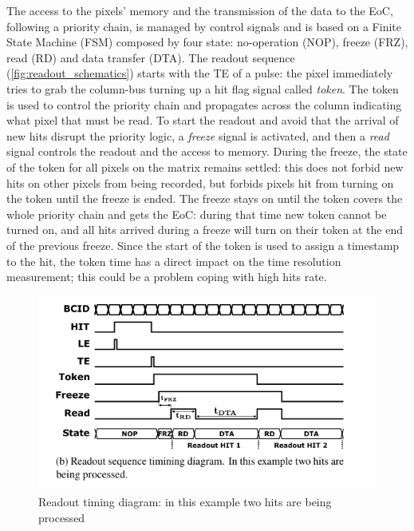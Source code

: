     The access to the pixels' memory and the transmission of the data to the EoC, following a priority chain, is managed by control signals and is based on a Finite State Machine (FSM) composed by four state: no-operation (NOP), freeze (FRZ), read (RD) and data transfer (DTA). The readout sequence (\ref{fig:readout_schematics}) starts with the TE of a pulse: the pixel immediately tries to grab the column-bus turning up a hit flag signal called \textit{token}.   
    The token is used to control the priority chain and propagates across the column indicating what pixel that must be read. To start the readout and avoid that the arrival of new hits disrupt the priority logic, a \textit{freeze} signal is activated, and then a \textit{read} signal controls the readout and the access to memory.
    During the freeze, the state of the token for all pixels on the matrix remains settled: this does not forbid new hits on other pixels from being recorded, but forbids pixels hit from turning on the token until the freeze is ended. 
    The freeze stays on until the token covers the whole priority chain and gets the EoC: during that time new token cannot be turned on, and all hits arrived during a freeze will turn on their token at the end of the previous freeze.  
    Since the start of the token is used to assign a timestamp to the hit, the token time has a direct impact on the time resolution measurement; this could be a problem coping with high hits rate. 
    \begin{figure}[h!]
        \centering
        \includegraphics[width=.5\linewidth]{figures/Monopix1/readout_timing.png}
        \caption{Readout timing diagram: in this example two hits are being processed}
        \label{fig:readout_timing}
    \end{figure}

